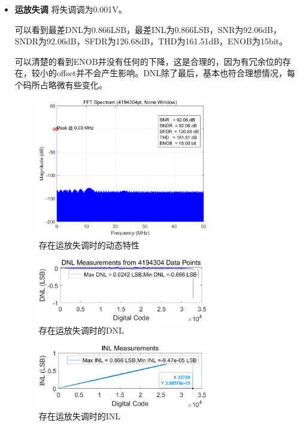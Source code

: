 \documentclass[cs4size,a4paper]{ctexart}
\numberwithin{equation}{section}
\numberwithin{table}{section}
\numberwithin{figure}{section}
\begin{document}
\begin{itemize}
		\item \textbf{运放失调} 将失调调为0.001V。
		
		可以看到最差DNL为0.866LSB，最差INL为0.866LSB，SNR为92.06dB，SNDR为92.06dB，SFDR为126.68dB，THD为161.51dB，ENOB为15bit。
		
		可以清楚的看到ENOB并没有任何的下降，这是合理的，因为有冗余位的存在，较小的offset并不会产生影响。DNL除了最后，基本也符合理想情况，每个码所占略微有些变化。

		\begin{figure}[H]
			\centering
			\includegraphics[width=0.7\textwidth]{pic/Avno/DFT.png}
			\caption{存在运放失调时的动态特性} 
		\end{figure}

		\begin{figure}[H]
			\centering
			\includegraphics[width=0.7\textwidth]{pic/Avno/DNL.png}
			\caption{存在运放失调时的DNL} 
		\end{figure}

		\begin{figure}[H]
			\centering
			\includegraphics[width=0.7\textwidth]{pic/Avno/INL.png}
			\caption{存在运放失调时的INL} 
		\end{figure}

	\end{itemize}
\end{document}
